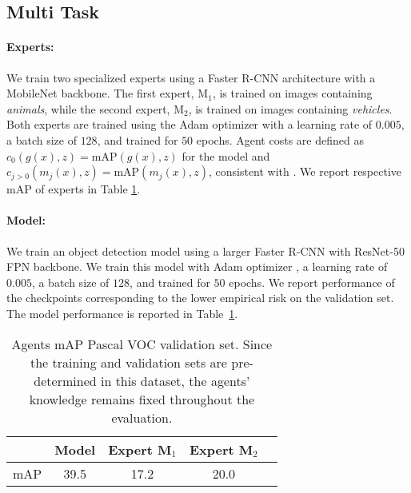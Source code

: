 \begin{appendices}
\subsection{Multi Task}\label{exp_appendix:multi}

\paragraph{Experts:} We train two specialized experts using a Faster R-CNN \cite{ren2016fasterrcnnrealtimeobject} architecture with a MobileNet \cite{howard2017mobilenetsefficientconvolutionalneural} backbone. The first expert, M$_1$, is trained on images containing \textit{animals}, while the second expert, M$_2$, is trained on images containing \textit{vehicles}. Both experts are trained using the Adam optimizer \citep{kingma2017adammethodstochasticoptimization} with a learning rate of $0.005$, a batch size of $128$, and trained for $50$ epochs. Agent costs are defined as \( c_0(g(x), z) = \text{mAP}(g(x), z) \) for the model and \( c_{j > 0}(m_j(x), z) = \text{mAP}(m_j(x), z) \), consistent with \citep{montreuil2024twostagelearningtodefermultitasklearning}.  We report respective mAP of experts in Table \ref{agent_pascal}.

\paragraph{Model:} We train an object detection model using a larger Faster R-CNN \citep{ren2016fasterrcnnrealtimeobject} with  ResNet-50 FPN \citep{he2015deepresiduallearningimage} backbone. We train this model with Adam optimizer \citep{kingma2017adammethodstochasticoptimization}, a learning rate of $0.005$, a batch size of $128$, and trained for $50$ epochs. We report performance of the checkpoints corresponding to the lower empirical risk on the validation set. The model performance is reported in Table~\ref{agent_pascal}.


\begin{table}[ht]\label{agent_pascal}
\begin{tabular}{@{}ccccc@{}}
\toprule
 & Model & Expert M$_1$ & Expert M$_2$   \\
\midrule
mAP &  39.5 & 17.2 & 20.0  \\
\bottomrule
\end{tabular}
\centering
\caption{Agents mAP Pascal VOC validation set. Since the training and validation sets are pre-determined in this dataset, the agents' knowledge remains fixed throughout the evaluation.}
\end{table}


\end{appendices}
